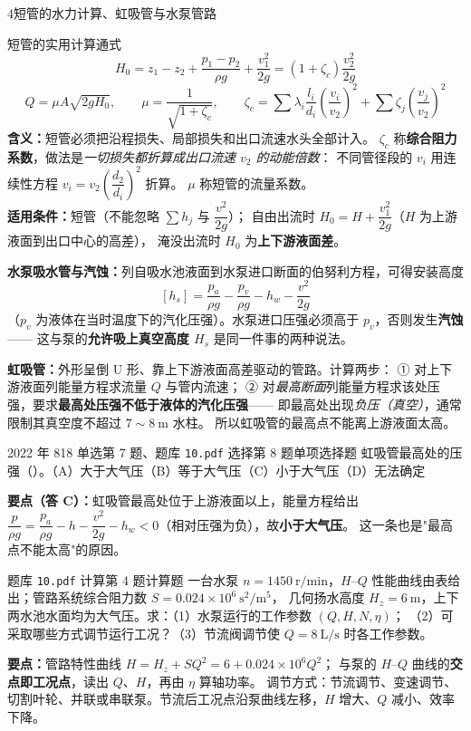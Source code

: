 \begin{kaodian}{4}{短管的水力计算、虹吸管与水泵管路}
\begin{gongshi}{短管的实用计算通式}
\[ H_0=z_1-z_2+\frac{p_1-p_2}{\rho g}+\frac{v_1^2}{2g}=(1+\zeta_c)\frac{v_2^2}{2g} \]
\[ Q=\mu A\sqrt{2gH_0},\qquad \mu=\frac{1}{\sqrt{1+\zeta_c}},\qquad
   \zeta_c=\sum\lambda_i\frac{l_i}{d_i}\left(\frac{v_i}{v_2}\right)^2+\sum\zeta_j\left(\frac{v_j}{v_2}\right)^2 \]
\textbf{含义：}短管必须把沿程损失、局部损失和出口流速水头全部计入。
$\zeta_c$ 称\textbf{综合阻力系数}，做法是\emph{一切损失都折算成出口流速 $v_2$ 的动能倍数}：
不同管径段的 $v_i$ 用连续性方程 $v_i=v_2\left(\dfrac{d_2}{d_i}\right)^2$ 折算。
$\mu$ 称短管的流量系数。\\
\textbf{适用条件：}短管（不能忽略 $\sum h_j$ 与 $\dfrac{v^2}{2g}$）；
自由出流时 $H_0=H+\dfrac{v_1^2}{2g}$（$H$ 为上游液面到出口中心的高差），
淹没出流时 $H_0$ 为\textbf{上下游液面差}。
\end{gongshi}

\textbf{水泵吸水管与汽蚀：}列自吸水池液面到水泵进口断面的伯努利方程，可得安装高度
\[ [h_s]=\frac{p_a}{\rho g}-\frac{p_v}{\rho g}-h_w-\frac{v^2}{2g} \]
（$p_v$ 为液体在当时温度下的汽化压强）。水泵进口压强必须高于 $p_v$，否则发生\textbf{汽蚀}——
这与泵的\textbf{允许吸上真空高度 $H_s$} 是同一件事的两种说法。

\textbf{虹吸管：}外形呈倒 U 形、靠上下游液面高差驱动的管路。计算两步：
① 对上下游液面列能量方程求流量 $Q$ 与管内流速；
② 对\emph{最高断面}列能量方程求该处压强，要求\textbf{最高处压强不低于液体的汽化压强}——
即最高处出现\emph{负压（真空）}，通常限制其真空度不超过 $7\sim8\ \mathrm{m}$ 水柱。
所以虹吸管的最高点不能离上游液面太高。

\begin{zhenti}{2022 年 818 单选第 7 题、题库 \texttt{10.pdf} 选择第 8 题}{单项选择题}
虹吸管最高处的压强（\quad）。（A）大于大气压（B）等于大气压（C）小于大气压（D）无法确定
\end{zhenti}
\noindent\textbf{要点（答 C）：}虹吸管最高处位于上游液面以上，能量方程给出
$\dfrac{p}{\rho g}=\dfrac{p_a}{\rho g}-h-\dfrac{v^2}{2g}-h_w<0$（相对压强为负），故\textbf{小于大气压}。
这一条也是"最高点不能太高"的原因。

\begin{zhenti}{题库 \texttt{10.pdf} 计算第 4 题}{计算题}
一台水泵 $n=1450\ \mathrm{r/min}$，$H$--$Q$ 性能曲线由表给出；管路系统综合阻力数 $S=0.024\times10^6\ \mathrm{s^2/m^5}$，
几何扬水高度 $H_z=6\ \mathrm{m}$，上下两水池水面均为大气压。求：（1）水泵运行的工作参数 $(Q,H,N,\eta)$；
（2）可采取哪些方式调节运行工况？（3）节流阀调节使 $Q=8\ \mathrm{L/s}$ 时各工作参数。
\end{zhenti}
\noindent\textbf{要点：}管路特性曲线 $H=H_z+SQ^2=6+0.024\times10^6Q^2$；
与泵的 $H$--$Q$ 曲线的\textbf{交点即工况点}，读出 $Q$、$H$，再由 $\eta$ 算轴功率。
调节方式：节流调节、变速调节、切割叶轮、并联或串联泵。节流后工况点沿泵曲线左移，$H$ 增大、$Q$ 减小、效率下降。


\end{kaodian}
